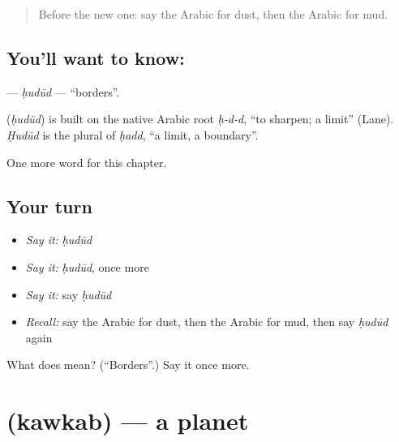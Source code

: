 \label{lesson:AR-C205-hudud}



\begin{quote}
Before the new one: say the Arabic for dust, then the Arabic for mud.
\end{quote}

\subsection*{You'll want to know: }
\textbf{} — \emph{ḥudūd} — \textquotedblleft{}borders\textquotedblright{}.

\begin{cousinweb}
\textbf{} (\emph{ḥudūd}) is built on the native Arabic root \emph{ḥ-d-d}, \textquotedblleft{}to sharpen; a limit\textquotedblright{} (Lane). \emph{Ḥudūd} is the plural of \emph{ḥadd}, \textquotedblleft{}a limit, a boundary\textquotedblright{}.
\end{cousinweb}

\begin{grammarlens}[title={What you've built}]
One more word for this chapter.
\end{grammarlens}

\subsection*{Your turn}
\begin{itemize}
\raggedright
  \item \emph{Say it:} \emph{ḥudūd}
  \item \emph{Say it:} \emph{ḥudūd}, once more
  \item \emph{Say it:} say \emph{ḥudūd}
  \item \emph{Recall:} say the Arabic for dust, then the Arabic for mud, then say \emph{ḥudūd} again
\end{itemize}

\begin{tcolorbox}[breakable,colback=teal!4,colframe=teal!35!black,title={Before you move on}]
What does  mean? (\textquotedblleft{}Borders\textquotedblright{}.) Say it once more.
\end{tcolorbox}
\section[\texorpdfstring{\ar{كوكب} (kawkab)}{كوكب (kawkab)}]{ (kawkab) — a planet}

\label{lesson:AR-C205-kawkab}



